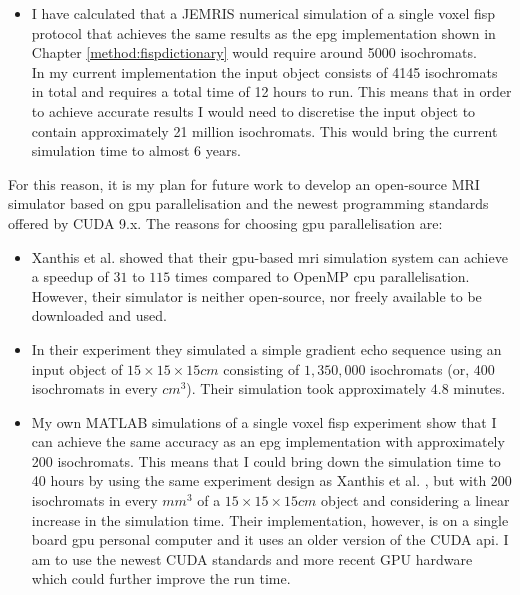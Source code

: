 \begin{enumerate}
	\begin{itemize}
	    
	    \item I have calculated that a JEMRIS numerical simulation of a single voxel \ac{fisp} protocol that achieves the same results as the \ac{epg} implementation shown in Chapter \ref{method:fispdictionary} would require around 5000 isochromats. \\
	    
	    In my current implementation the input object consists of 4145 isochromats in total and requires a total time of 12 hours to run.
	    This means that in order to achieve accurate results I would need to discretise the input object to contain approximately 21 million isochromats.
	    This would bring the current simulation time to almost 6 years.
	    
	\end{itemize}
	
	For this reason, it is my plan for future work to develop an open-source MRI simulator based on \ac{gpu} parallelisation and the newest programming standards offered by CUDA 9.x.
	The reasons for choosing \ac{gpu} parallelisation are:
	
	\begin{itemize}
	    
	    \item Xanthis et al. \cite{Xanthis2014} showed that their \ac{gpu}-based \ac{mri} simulation system can achieve a speedup of $31$ to $115$ times compared to OpenMP \ac{cpu} parallelisation.
	    However, their simulator is neither open-source, nor freely available to be downloaded and used.
	    
	    \item In their experiment they simulated a simple gradient echo sequence using an input object of $15 \times 15 \times 15cm$ consisting of $1, 350, 000$ isochromats (or, $400$ isochromats in every $cm^3$).
	    Their simulation took approximately $4.8$ minutes.
	    
	    \item My own MATLAB simulations of a single voxel \ac{fisp} experiment show that I can achieve the same accuracy as an \ac{epg} implementation with approximately 200 isochromats.
	    This means that I could bring down the simulation time to 40 hours by using the same experiment design as Xanthis et al. \cite{Xanthis2014}, but with $200$ isochromats in every $mm^3$ of a $15 \times 15 \times 15cm$ object and considering a linear increase in the simulation time.
	    Their implementation, however, is on a single board \ac{gpu} personal computer and it uses an older version of the CUDA \ac{api}.
	    I am to use the newest CUDA standards and more recent GPU hardware which could further improve the run time.
	    

\end{itemize}
\end{enumerate}
